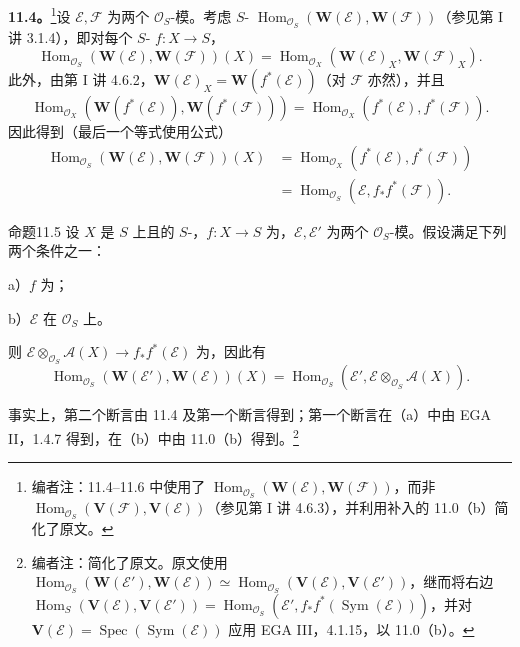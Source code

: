 \textbf{11.4。}\footnote{编者注：11.4--11.6 中使用了 $\operatorname{Hom}_{\mathcal O_S}(\mathbf W(\mathcal E),\mathbf W(\mathcal F))$，而非 $\operatorname{Hom}_{\mathcal O_S}(\mathbf V(\mathcal F),\mathbf V(\mathcal E))$（参见第 I 讲 4.6.3），并利用补入的 11.0（b）简化了原文。}设 $\mathcal E,\mathcal F$ 为两个 $\mathcal O_S$-模。考虑 $S$- $\operatorname{Hom}_{\mathcal O_S}(\mathbf W(\mathcal E),\mathbf W(\mathcal F))$（参见第 I 讲 3.1.4），即对每个 $S$- $f:X\to S$，
\[
\operatorname{Hom}_{\mathcal O_S}(\mathbf W(\mathcal E),\mathbf W(\mathcal F))(X)
=\operatorname{Hom}_{\mathcal O_X}(\mathbf W(\mathcal E)_X,\mathbf W(\mathcal F)_X).
\]
此外，由第 I 讲 4.6.2，$\mathbf W(\mathcal E)_X=\mathbf W(f^*(\mathcal E))$（对 $\mathcal F$ 亦然），并且
\[
\operatorname{Hom}_{\mathcal O_X}(\mathbf W(f^*(\mathcal E)),\mathbf W(f^*(\mathcal F)))
=\operatorname{Hom}_{\mathcal O_X}(f^*(\mathcal E),f^*(\mathcal F)).
\]
因此得到（最后一个等式使用公式）
\[
\begin{aligned}
\operatorname{Hom}_{\mathcal O_S}(\mathbf W(\mathcal E),\mathbf W(\mathcal F))(X)
&=\operatorname{Hom}_{\mathcal O_X}(f^*(\mathcal E),f^*(\mathcal F))\\
&=\operatorname{Hom}_{\mathcal O_S}(\mathcal E,f_*f^*(\mathcal F)).
\end{aligned}\tag{$\dagger$}
\]
\begin{SGAresult}{命题}{11.5}
设 $X$ 是 $S$ 上且的 $S$-，$f:X\to S$ 为，$\mathcal E,\mathcal E'$ 为两个 $\mathcal O_S$-模。假设满足下列两个条件之一：

 a）$f$ 为；

 b）$\mathcal E$ 在 $\mathcal O_S$ 上。

则 $\mathcal E\otimes_{\mathcal O_S}\mathcal A(X)\to f_*f^*(\mathcal E)$ 为，因此有
\[
\operatorname{Hom}_{\mathcal O_S}(\mathbf W(\mathcal E'),\mathbf W(\mathcal E))(X)
=\operatorname{Hom}_{\mathcal O_S}(\mathcal E',\mathcal E\otimes_{\mathcal O_S}\mathcal A(X)).
\]
\end{SGAresult}
事实上，第二个断言由 11.4 及第一个断言得到；第一个断言在（a）中由 EGA II，1.4.7 得到，在（b）中由 11.0（b）得到。\footnote{编者注：简化了原文。原文使用 $\operatorname{Hom}_{\mathcal O_S}(\mathbf W(\mathcal E'),\mathbf W(\mathcal E))\simeq\operatorname{Hom}_{\mathcal O_S}(\mathbf V(\mathcal E),\mathbf V(\mathcal E'))$，继而将右边
$\operatorname{Hom}_S(\mathbf V(\mathcal E),\mathbf V(\mathcal E'))=\operatorname{Hom}_{\mathcal O_S}(\mathcal E',f_*f^*(\operatorname{Sym}(\mathcal E)))$，并对 $\mathbf V(\mathcal E)=\operatorname{Spec}(\operatorname{Sym}(\mathcal E))$ 应用 EGA III，4.1.15，以 11.0（b）。}

